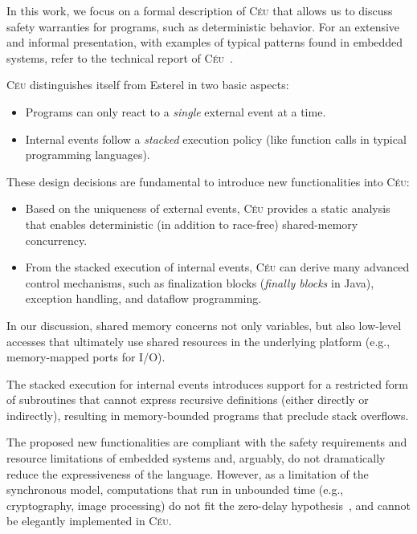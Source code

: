 \documentclass[preprint]{sigplanconf}
\newcommand{\CEU}{\textsc{C\'{e}u}\xspace}
\newcommand{\1}{\;}
\newcommand{\2}{\;\;}
\newcommand{\3}{\;\;\;}
\newcommand{\5}{\;\;\;\;\;}
\begin{document}
In this work, we focus on a formal description of \CEU that allows us to 
discuss safety warranties for programs, such as deterministic behavior.
For an extensive and informal presentation, with examples of typical patterns 
found in embedded systems, refer to the technical report of \CEU~\cite{ceu.tr}.

\CEU distinguishes itself from Esterel in two basic aspects:

\begin{itemize}
\item Programs can only react to a \emph{single} external event at a time.  
\item Internal events follow a \emph{stacked} execution policy (like function 
calls in typical programming languages).
\end{itemize}

These design decisions are fundamental to introduce new functionalities into 
\CEU:

\begin{itemize}
\item Based on the uniqueness of external events, \CEU provides a static 
analysis that enables deterministic (in addition to race-free) shared-memory 
concurrency.
\item From the stacked execution of internal events, \CEU can derive many 
advanced control mechanisms, such as finalization blocks (\emph{finally blocks} 
in Java), exception handling, and dataflow programming.
\end{itemize}

In our discussion, shared memory concerns not only variables, but also 
low-level accesses that ultimately use shared resources in the underlying 
platform (e.g., memory-mapped ports for I/O).

The stacked execution for internal events introduces support for a restricted 
form of subroutines that cannot express recursive definitions (either directly 
or indirectly), resulting in memory-bounded programs that preclude stack 
overflows.

The proposed new functionalities are compliant with the safety requirements and 
resource limitations of embedded systems and, arguably, do not dramatically 
reduce the expressiveness of the language.
However, as a limitation of the synchronous model, computations that run in 
unbounded time (e.g., cryptography, image processing) do not fit the zero-delay 
hypothesis~\cite{rp.hypothesis}, and cannot be elegantly implemented in \CEU.
\end{document}

